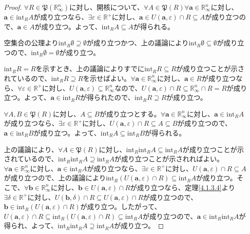 \documentclass[dvipdfmx]{jsarticle}
\begin{document}
\begin{proof}
$\forall R \in \mathfrak{P}\left( \mathbb{R}_{\infty}^{n} \right)$に対し、開核について、$\forall A \in \mathfrak{P}(R)\forall\mathbf{a} \in \mathbb{R}_{\infty}^{n}$に対し、$\mathbf{a} \in \mathrm{int}_{R}A$が成り立つなら、$\exists\varepsilon \in \mathbb{R}^{+}$に対し、$\mathbf{a} \in U\left( \mathbf{a},\varepsilon \right) \cap R \subseteq A$が成り立つので、$\mathbf{a} \in A$が成り立つ。よって、$\mathrm{int}_{R}A \subseteq A$が得られる。\par
空集合の公理より$\mathrm{int}_{R}\emptyset \supseteq \emptyset$が成り立つかつ、上の議論により$\mathrm{int}_{R}\emptyset \subseteq \emptyset$が成り立つので、$\mathrm{int}_{R}\emptyset = \emptyset$が成り立つ。\par
$\mathrm{int}_{R}R = R$を示すとき、上の議論によりすでに$\mathrm{int}_{R}R \subseteq R$が成り立つことが示されているので、$\mathrm{int}_{R}R \supseteq R$を示せばよい。$\forall\mathbf{a} \in \mathbb{R}_{\infty}^{n}$に対し、$\mathbf{a} \in R$が成り立つなら、$\forall\varepsilon \in \mathbb{R}^{+}$に対し、$U\left( \mathbf{a},\varepsilon \right) \subseteq \mathbb{R}_{\infty}^{n}$なので、$U\left( \mathbf{a},\varepsilon \right) \cap R \subseteq \mathbb{R}_{\infty}^{n} \cap R = R$が成り立つ。よって、$\mathbf{a} \in \mathrm{int}_{R}R$が得られたので、$\mathrm{int}_{R}R \supseteq R$が成り立つ。\par
$\forall A,B \in \mathfrak{P}(R)$に対し、$A \subseteq B$が成り立つとする。$\forall\mathbf{a} \in \mathbb{R}_{\infty}^{n}$に対し、$\mathbf{a} \in \mathrm{int}_{R}A$が成り立つなら、$\exists\varepsilon \in \mathbb{R}^{+}$に対し、$U\left( \mathbf{a},\varepsilon \right) \cap R \subseteq A \subseteq B$が成り立つので、$\mathbf{a} \in \mathrm{int}_{R}B$が成り立つ。よって、$\mathrm{int}_{R}A \subseteq \mathrm{int}_{R}B$が得られる。\par
上の議論により、$\forall A \in \mathfrak{P}(R)$に対し、$\mathrm{int}_{R}{\mathrm{int}_{R}A} \subseteq \mathrm{int}_{R}A$が成り立つことが示されているので、$\mathrm{int}_{R}{\mathrm{int}_{R}A} \supseteq \mathrm{int}_{R}A$が成り立つことが示されればよい。$\forall\mathbf{a} \in \mathbb{R}_{\infty}^{n}$に対し、$\mathbf{a} \in \mathrm{int}_{R}A$が成り立つなら、$\exists\varepsilon \in \mathbb{R}^{+}$に対し、$U\left( \mathbf{a},\varepsilon \right) \cap R \subseteq A$が成り立つので、上の議論により$\mathrm{int}_{R}\left( U\left( \mathbf{a},\varepsilon \right) \cap R \right) \subseteq \mathrm{int}_{R}A$が成り立つ。そこで、$\forall\mathbf{b} \in \mathbb{R}_{\infty}^{n}$に対し、$\mathbf{b} \in U\left( \mathbf{a},\varepsilon \right) \cap R$が成り立つなら、定理\ref{4.1.3.4}より$\exists\delta \in \mathbb{R}^{+}$に対し、$U\left( \mathbf{b},\delta \right) \cap R \subseteq U\left( \mathbf{a},\varepsilon \right) \cap R$が成り立つので、$\mathbf{b} \in \mathrm{int}_{R}\left( U\left( \mathbf{a},\varepsilon \right) \cap R \right)$が成り立つ。したがって、$U\left( \mathbf{a},\varepsilon \right) \cap R \subseteq \mathrm{int}_{R}\left( U\left( \mathbf{a},\varepsilon \right) \cap R \right) \subseteq \mathrm{int}_{R}A$が成り立つので、$\mathbf{a} \in \mathrm{int}_{R}{\mathrm{int}_{R}A}$が得られ、よって、$\mathrm{int}_{R}{\mathrm{int}_{R}A} \supseteq \mathrm{int}_{R}A$が成り立つ。\par

\end{proof}
\end{document}
